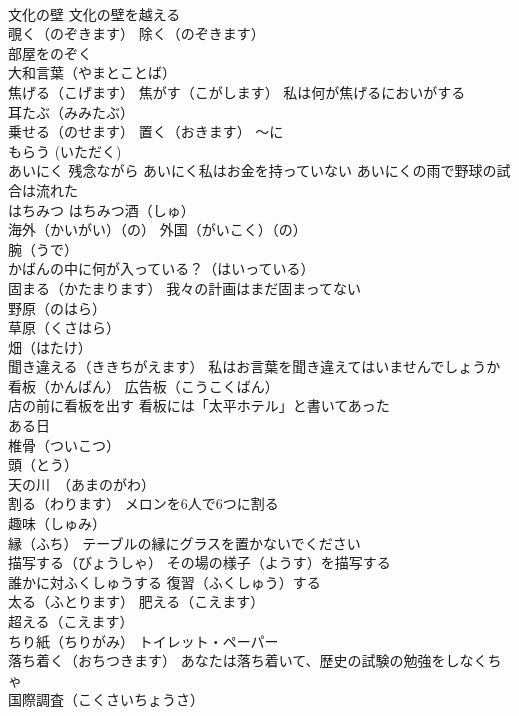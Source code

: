\documentclass[8pt]{extreport}
\begin{document}
\begin{CJK}{UTF8}{min}
\\	文化の壁 文化の壁を越える
\\	覗く（のぞきます） 除く（のぞきます） 
\\	部屋をのぞく
\\	大和言葉（やまとことば）
\\	焦げる（こげます） 焦がす（こがします） 私は何が焦げるにおいがする
\\	耳たぶ（みみたぶ）
\\	乗せる（のせます） 置く（おきます） ～に
\\	もらう (いただく)
\\	あいにく 残念ながら あいにく私はお金を持っていない あいにくの雨で野球の試合は流れた
\\	はちみつ はちみつ酒（しゅ）
\\	海外（かいがい）（の） 外国（がいこく）（の）
\\	腕（うで）
\\	かばんの中に何が入っている？（はいっている）
\\	固まる（かたまります） 我々の計画はまだ固まってない
\\	野原（のはら） 
\\	草原（くさはら）
\\	畑（はたけ）
\\	聞き違える（ききちがえます） 私はお言葉を聞き違えてはいませんでしょうか
\\	看板（かんばん） 広告板（こうこくばん）
\\	店の前に看板を出す 看板には「太平ホテル」と書いてあった
\\	ある日
\\	椎骨（ついこつ）
\\	頭（とう）
\\	天の川　（あまのがわ）
\\	割る（わります） メロンを6人で6つに割る
\\	趣味（しゅみ）
\\	縁（ふち） テーブルの縁にグラスを置かないでください
\\	描写する（びょうしゃ） その場の様子（ようす）を描写する
\\	誰かに対ふくしゅうする 復習（ふくしゅう）する 
\\	太る（ふとります） 肥える（こえます）
\\	超える（こえます）
\\	ちり紙（ちりがみ） トイレット・ペーパー
\\	落ち着く（おちつきます） あなたは落ち着いて、歴史の試験の勉強をしなくちゃ
\\	国際調査（こくさいちょうさ）

\end{CJK}
\end{document}
